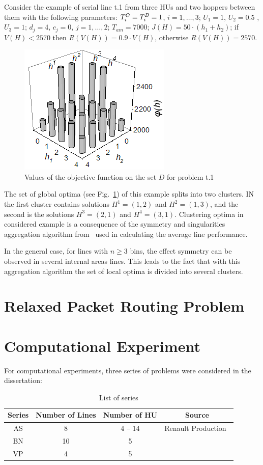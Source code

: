 \documentclass{ifacconf}
\begin{document}
Consider the example of serial line t.1 from
three HUs and two hoppers between them with the following parameters: ${T^{\rm O}_i=T^{\rm B}_i=1}$, $i = 1,\ldots,3$;
 ${U_1=1}$, ${U_2=0.5}$ , ${U_3=1}$;
 ${d_j=4}$, ${c_j=0}$, $j = 1,\ldots,2$;
 $T_{am}=7000$;
 $J(H)=50\cdot(h_1+h_2)$;
 if $V(H) < 2570$ then $R(V(H))=0.9\cdot V(H)$, otherwise $R(V(H))=2570$.

 \begin{figure}[h!]
	\centering
	\includegraphics[scale=0.9]{test}
  \caption{Values of the objective function on the set $D$ for problem t.1\label{t_1}}
  \end{figure}

The set of global optima (see Fig.~\ref{t_1}) of this example splits into two clusters. IN
the first cluster contains solutions $H^1=(1,2)$ and $H^2=(1,3)$, and
the second is the solutions $H^3=(2,1)$ and $H^4=(3,1)$. Clustering optima in
considered example is a consequence of the symmetry and singularities
aggregation algorithm from~\cite{Dol} used in calculating the average
line performance.

In the general case, for lines with $n\geq 3$ bins, the effect
symmetry can be observed in several internal areas
lines. This leads to the fact that with this aggregation algorithm
the set of local optima is divided into several clusters.

\section{Relaxed Packet Routing Problem} \label{formulation}

\section{Computational Experiment}
For computational experiments, three series of problems were considered in the dissertation:
\begin{table}[!ht]
\centering
\small
\begin{tabular}{|c|c|c|c|}
\hline
Series&Number of Lines&Number of HU&Source\\
\hline
AS & 8 & 4 -- 14 & Renault Production~\cite{Ancelin1987}\\
BN & 10 & 5 & \cite{eng1}\\
VP & 4 & 5 & \cite{vp}\\
\hline
\end{tabular}
\caption{List of series}\label{tabl:series}
\vspace{-0.5cm}
\end{table}
\end{document}
